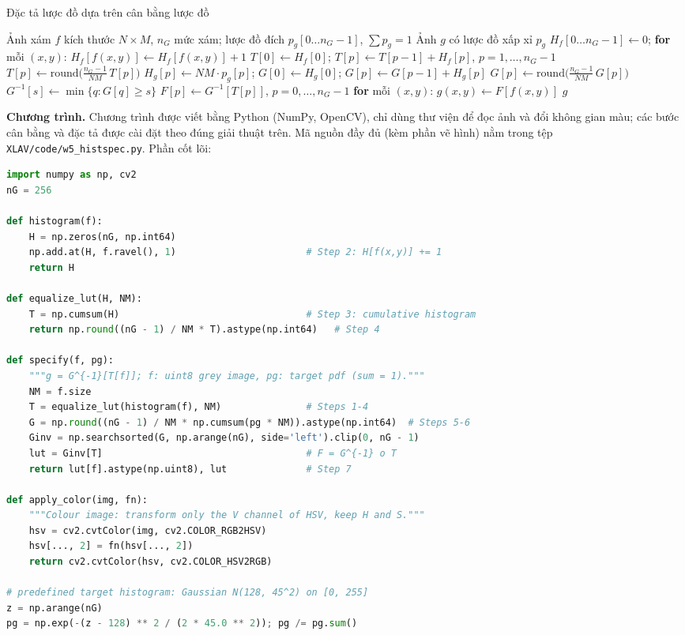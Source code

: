 \begin{algorithm}[ht]
\caption{Đặc tả lược đồ dựa trên cân bằng lược đồ}
\label{alg:w5_spec}
\begin{algorithmic}[1]
\Require Ảnh xám $f$ kích thước $N \times M$, $n_G$ mức xám; lược đồ đích $p_g[0 \ldots n_G - 1]$, $\sum p_g = 1$
\Ensure Ảnh $g$ có lược đồ xấp xỉ $p_g$
\State $H_f[0 \ldots n_G - 1] \gets 0$; \quad \textbf{for} mỗi $(x, y)$: $H_f[f(x, y)] \gets H_f[f(x, y)] + 1$ 
\State $T[0] \gets H_f[0]$; \quad $T[p] \gets T[p - 1] + H_f[p]$, $p = 1, \ldots, n_G - 1$ 
\State $T[p] \gets \mathrm{round}\big(\frac{n_G - 1}{NM}\,T[p]\big)$ 
\State $H_g[p] \gets NM \cdot p_g[p]$; \quad $G[0] \gets H_g[0]$; \quad $G[p] \gets G[p - 1] + H_g[p]$ 
\State $G[p] \gets \mathrm{round}\big(\frac{n_G - 1}{NM}\,G[p]\big)$ 
    \State $G^{-1}[s] \gets \min\{q : G[q] \ge s\}$ 
\EndFor
\State $F[p] \gets G^{-1}[T[p]]$, $p = 0, \ldots, n_G - 1$ 
\State \textbf{for} mỗi $(x, y)$: $g(x, y) \gets F[f(x, y)]$ 
\State \Return $g$
\end{algorithmic}
\end{algorithm}

\textbf{Chương trình.} Chương trình được viết bằng Python (NumPy, OpenCV), chỉ dùng thư viện để đọc ảnh và đổi không gian màu; các bước cân bằng và đặc tả được cài đặt theo đúng giải thuật trên. Mã nguồn đầy đủ (kèm phần vẽ hình) nằm trong tệp \texttt{XLAV/code/w5\_histspec.py}. Phần cốt lõi:
\begin{lstlisting}[language=Python]
import numpy as np, cv2
nG = 256

def histogram(f):
    H = np.zeros(nG, np.int64)
    np.add.at(H, f.ravel(), 1)                       # Step 2: H[f(x,y)] += 1
    return H

def equalize_lut(H, NM):
    T = np.cumsum(H)                                 # Step 3: cumulative histogram
    return np.round((nG - 1) / NM * T).astype(np.int64)   # Step 4

def specify(f, pg):
    """g = G^{-1}[T[f]]; f: uint8 grey image, pg: target pdf (sum = 1)."""
    NM = f.size
    T = equalize_lut(histogram(f), NM)               # Steps 1-4
    G = np.round((nG - 1) / NM * np.cumsum(pg * NM)).astype(np.int64)  # Steps 5-6
    Ginv = np.searchsorted(G, np.arange(nG), side='left').clip(0, nG - 1)
    lut = Ginv[T]                                    # F = G^{-1} o T
    return lut[f].astype(np.uint8), lut              # Step 7

def apply_color(img, fn):
    """Colour image: transform only the V channel of HSV, keep H and S."""
    hsv = cv2.cvtColor(img, cv2.COLOR_RGB2HSV)
    hsv[..., 2] = fn(hsv[..., 2])
    return cv2.cvtColor(hsv, cv2.COLOR_HSV2RGB)

# predefined target histogram: Gaussian N(128, 45^2) on [0, 255]
z = np.arange(nG)
pg = np.exp(-(z - 128) ** 2 / (2 * 45.0 ** 2)); pg /= pg.sum()
\end{lstlisting}

